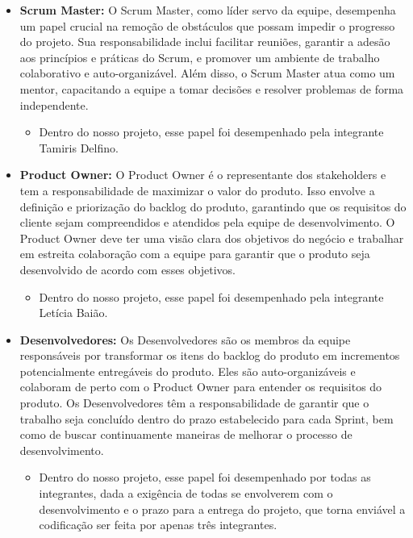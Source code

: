 \begin{itemize}
    \item \textbf{Scrum Master:}
O Scrum Master, como líder servo da equipe, desempenha um papel crucial na remoção de obstáculos que possam impedir o progresso do projeto. Sua responsabilidade inclui facilitar reuniões, garantir a adesão aos princípios e práticas do Scrum, e promover um ambiente de trabalho colaborativo e auto-organizável. Além disso, o Scrum Master atua como um mentor, capacitando a equipe a tomar decisões e resolver problemas de forma independente. 
    \begin{itemize}
        \item Dentro do nosso projeto, esse papel foi desempenhado pela integrante Tamiris Delfino.
    \end{itemize}
    
    \item \textbf{Product Owner:}
O Product Owner é o representante dos stakeholders e tem a responsabilidade de maximizar o valor do produto. Isso envolve a definição e priorização do backlog do produto, garantindo que os requisitos do cliente sejam compreendidos e atendidos pela equipe de desenvolvimento. O Product Owner deve ter uma visão clara dos objetivos do negócio e trabalhar em estreita colaboração com a equipe para garantir que o produto seja desenvolvido de acordo com esses objetivos.
\begin{itemize}
        \item Dentro do nosso projeto, esse papel foi desempenhado pela integrante Letícia Baião.
    \end{itemize}

    \item \textbf{Desenvolvedores:} 
Os Desenvolvedores são os membros da equipe responsáveis por transformar os itens do backlog do produto em incrementos potencialmente entregáveis do produto. Eles são auto-organizáveis e colaboram de perto com o Product Owner para entender os requisitos do produto. Os Desenvolvedores têm a responsabilidade de garantir que o trabalho seja concluído dentro do prazo estabelecido para cada Sprint, bem como de buscar continuamente maneiras de melhorar o processo de desenvolvimento.
    \begin{itemize}
        \item Dentro do nosso projeto, esse papel foi desempenhado por todas as integrantes, dada a exigência de todas se envolverem com o desenvolvimento e o prazo para a entrega do projeto, que torna enviável a codificação ser feita por apenas três integrantes.
    \end{itemize}
\end{itemize}

